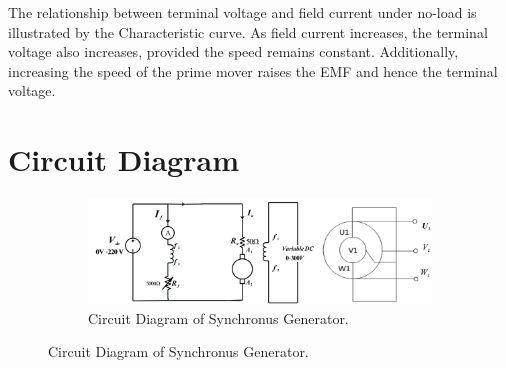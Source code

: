 \documentclass[a4paper,12pt]{article}
\begin{document}
	The relationship between terminal voltage and field current under no-load is illustrated by the Characteristic curve. As field current increases, the terminal voltage also increases, provided the speed remains constant. Additionally, increasing the speed of the prime mover raises the EMF and hence the terminal voltage.
	\section{Circuit Diagram}
		\begin{figure}[H]
		\centering
		\begin{subfigure}[t]{.9\textwidth}
			\centering
			\includegraphics[width=1.1\textwidth]{Images/3108exp02}
			\caption{Circuit Diagram of Synchronus Generator.}
		
		\end{subfigure}
		
	
		
		\end{figure}
	
\end{document}
